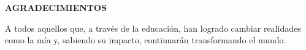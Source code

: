 \thispagestyle{empty}
\begin{center}
\textbf{AGRADECIMIENTOS}
\par\end{center}

A todos aquellos que, a través de la educación, han logrado cambiar realidades como la mía y, sabiendo su impacto, continuarán transformando el mundo.